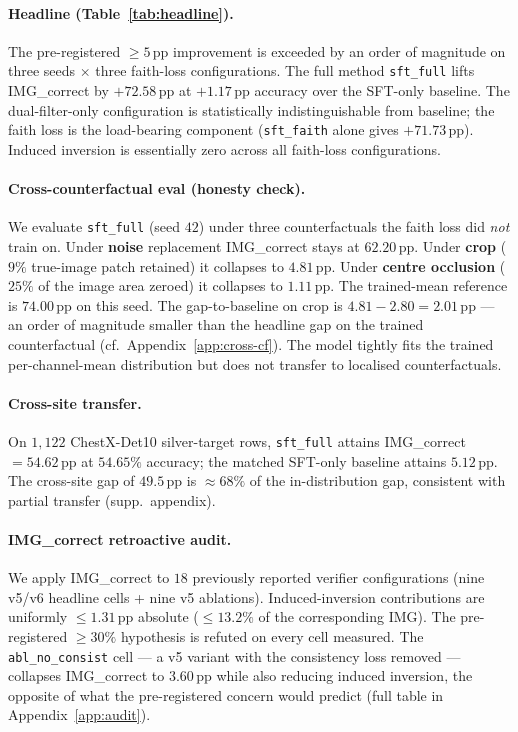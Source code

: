 \documentclass{article}
\begin{document}
\paragraph{Headline (Table~\ref{tab:headline}).} The pre-registered
$\geq 5$\,pp improvement is exceeded by an order of magnitude on
three seeds $\times$ three faith-loss configurations. The full
method \texttt{sft\_full} lifts IMG\_correct by $+72.58$\,pp at
$+1.17$\,pp accuracy over the SFT-only baseline. The
dual-filter-only configuration is statistically indistinguishable
from baseline; the faith loss is the load-bearing component
(\texttt{sft\_faith} alone gives $+71.73$\,pp). Induced inversion
is essentially zero across all faith-loss configurations.

\paragraph{Cross-counterfactual eval (honesty check).} We evaluate
\texttt{sft\_full} (seed $42$) under three counterfactuals the
faith loss did \emph{not} train on. Under \textbf{noise}
replacement IMG\_correct stays at $62.20$\,pp. Under \textbf{crop}
($9\%$ true-image patch retained) it collapses to $4.81$\,pp.
Under \textbf{centre occlusion} ($25\%$ of the image area zeroed)
it collapses to $1.11$\,pp. The trained-mean reference is
$74.00$\,pp on this seed. The gap-to-baseline on crop is
$4.81 - 2.80 = 2.01$\,pp --- an order of magnitude smaller than the
headline gap on the trained counterfactual (cf.\
Appendix~\ref{app:cross-cf}). The model tightly fits the trained
per-channel-mean distribution but does not transfer to localised
counterfactuals.

\paragraph{Cross-site transfer.} On $1{,}122$ ChestX-Det10
silver-target rows, \texttt{sft\_full} attains IMG\_correct
$= 54.62$\,pp at $54.65\%$ accuracy; the matched SFT-only baseline
attains $5.12$\,pp. The cross-site gap of $49.5$\,pp is
$\approx 68\%$ of the in-distribution gap, consistent with partial
transfer (supp.\ appendix).

\paragraph{IMG\_correct retroactive audit.}
\label{sec:audit}
We apply IMG\_correct to $18$ previously reported verifier
configurations (nine v5/v6 headline cells + nine v5 ablations).
Induced-inversion contributions are uniformly $\leq 1.31$\,pp
absolute ($\leq 13.2\%$ of the corresponding IMG). The
pre-registered $\geq 30\%$ hypothesis is refuted on every cell
measured. The \texttt{abl\_no\_consist} cell --- a v5 variant with
the consistency loss removed --- collapses IMG\_correct to
$3.60$\,pp while also reducing induced inversion, the opposite of
what the pre-registered concern would predict (full table in
Appendix~\ref{app:audit}).
\end{document}
